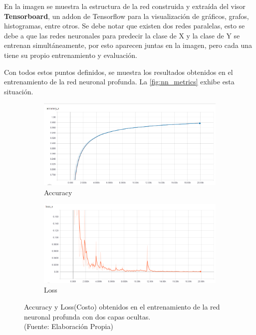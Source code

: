 En la imagen se muestra la estructura de la red construida y extraída del visor \textbf{Tensorboard}, un addon de Tensorflow para la visualización de gráficos, grafos, histogramas, entre otros. Se debe notar que existen dos redes paralelas, esto se debe a que las redes neuronales para predecir la clase de X y la clase de Y se entrenan simultáneamente, por esto aparecen juntas en la imagen, pero cada una tiene su propio entrenamiento y evaluación.

Con todos estos puntos definidos, se muestra los resultados obtenidos en el entrenamiento de la red neuronal profunda. La \autoref{fig:nn_metrics} exhibe esta situación.

\newpage


\begin{figure}[ht!]
\centering
\begin{subfigure}{.5\textwidth}
  \centering
  \includegraphics[width=1.0\linewidth]{figures/nn_plot.png}
  \caption{Accuracy}
  \label{fig:sub1}
\end{subfigure}%
\begin{subfigure}{.5\textwidth}
  \centering
  \includegraphics[width=1.0\linewidth]{figures/nn_loss.png}
  \caption{Loss}
  \label{fig:sub2}
\end{subfigure}
\caption[Accuracy y Loss(Costo) obtenidos en el entrenamiento de la red neuronal profunda]{Accuracy y Loss(Costo) obtenidos en el entrenamiento de la red neuronal profunda con dos capas ocultas. \\
{\scriptsize (Fuente: Elaboración Propia)}}
\label{fig:nn_metrics}
\end{figure}

